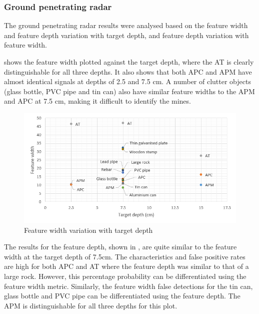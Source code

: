 \documentclass[main.tex]{subfiles}
\begin{document}
\subsubsection{Ground penetrating radar}
The ground penetrating radar results were analysed based on the feature width and feature depth variation with target depth, and feature depth variation with feature width. 

 shows the feature width plotted against the target depth, where the AT is clearly distinguishable for all three depths. It also shows that both APC and APM have almost identical signals at depths of 2.5 and 7.5 cm. A number of clutter objects (glass bottle, PVC pipe and tin can) also have similar feature widths to the APM and APC at 7.5 cm, making it difficult to identify the mines. 

\begin{figure}[ht]
\includegraphics[width=\textwidth]{5-Testing/featureWidth.PNG}
\centering
\caption{Feature width variation with target depth}
\end{figure}

The results for the feature depth, shown in , are quite similar to the feature width at the target depth of 7.5cm. The characteristics and false positive rates are high for both APC and AT where the feature depth was similar to that of a large rock. However, this percentage probability can be differentiated using the feature width metric. Similarly, the feature width false detections for the tin can, glass bottle and PVC pipe can be differentiated using the feature depth. The APM is distinguishable for all three depths for this plot.
\end{document}
